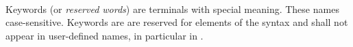 
\begin{grammar}
\oneof \\
\end{grammar}

\specsubitem
Keywords (or \textit{reserved words}) are terminals with special meaning. These
names case-sensitive. Keywords are are reserved for elements of the syntax and
shall not appear in user-defined names, in particular in .
